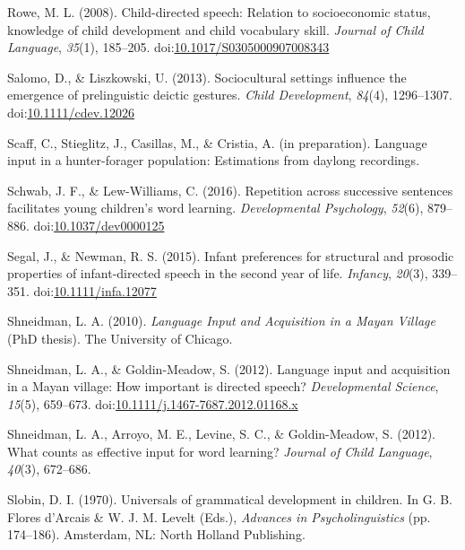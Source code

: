 \documentclass[floatsintext,man]{apa6}
\theoremstyle{definition}
\theoremstyle{definition}
\theoremstyle{definition}
\theoremstyle{remark}
\begin{document}
\hypertarget{ref-rowe2008child}{}
Rowe, M. L. (2008). Child-directed speech: Relation to socioeconomic
status, knowledge of child development and child vocabulary skill.
\emph{Journal of Child Language}, \emph{35}(1), 185--205.
doi:\href{https://doi.org/10.1017/S0305000907008343}{10.1017/S0305000907008343}

\hypertarget{ref-salomo2013sociocultural}{}
Salomo, D., \& Liszkowski, U. (2013). Sociocultural settings influence
the emergence of prelinguistic deictic gestures. \emph{Child
Development}, \emph{84}(4), 1296--1307.
doi:\href{https://doi.org/10.1111/cdev.12026}{10.1111/cdev.12026}

\hypertarget{ref-scaffIPlanguage}{}
Scaff, C., Stieglitz, J., Casillas, M., \& Cristia, A. (in preparation).
Language input in a hunter-forager population: Estimations from daylong
recordings.

\hypertarget{ref-schwab2016repetition}{}
Schwab, J. F., \& Lew-Williams, C. (2016). Repetition across successive
sentences facilitates young children's word learning.
\emph{Developmental Psychology}, \emph{52}(6), 879--886.
doi:\href{https://doi.org/10.1037/dev0000125}{10.1037/dev0000125}

\hypertarget{ref-segal2015infant}{}
Segal, J., \& Newman, R. S. (2015). Infant preferences for structural
and prosodic properties of infant-directed speech in the second year of
life. \emph{Infancy}, \emph{20}(3), 339--351.
doi:\href{https://doi.org/10.1111/infa.12077}{10.1111/infa.12077}

\hypertarget{ref-shneidman2010language}{}
Shneidman, L. A. (2010). \emph{Language Input and Acquisition in a Mayan
Village} (PhD thesis). The University of Chicago.

\hypertarget{ref-shneidman2012language}{}
Shneidman, L. A., \& Goldin-Meadow, S. (2012). Language input and
acquisition in a Mayan village: How important is directed speech?
\emph{Developmental Science}, \emph{15}(5), 659--673.
doi:\href{https://doi.org/10.1111/j.1467-7687.2012.01168.x}{10.1111/j.1467-7687.2012.01168.x}

\hypertarget{ref-shneidman2012counts}{}
Shneidman, L. A., Arroyo, M. E., Levine, S. C., \& Goldin-Meadow, S.
(2012). What counts as effective input for word learning? \emph{Journal
of Child Language}, \emph{40}(3), 672--686.

\hypertarget{ref-slobin1970universals}{}
Slobin, D. I. (1970). Universals of grammatical development in children.
In G. B. Flores d'Arcais \& W. J. M. Levelt (Eds.), \emph{Advances in
Psycholinguistics} (pp. 174--186). Amsterdam, NL: North Holland
Publishing.
\end{document}

